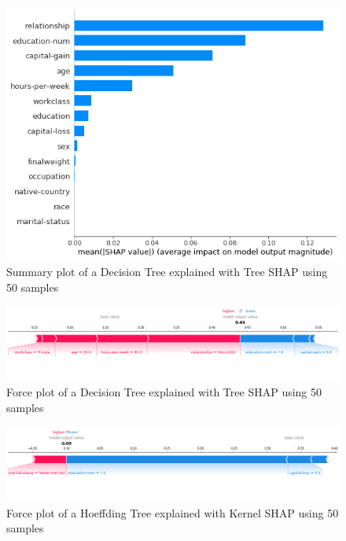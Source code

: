 \documentclass[conference]{IEEEtran}
\begin{document}
\begin{figure}[htbp]
\centerline{
	\includegraphics[width=\linewidth]{../fig/ex_01_TreeShap_DecisionTree_50_Samples_SummaryPlot.png}
}
\caption{Summary plot of a Decision Tree explained with Tree SHAP using 50 samples}
\label{fig2}
\end{figure}

\begin{figure}[htbp]
\centerline{
	\includegraphics[width=\linewidth]{../fig/ex_01_TreeShap_DecisionTree_50_Samples_ForcePlot_sample_1.png}
}
\caption{Force plot of a Decision Tree explained with Tree SHAP using 50 samples}
\label{fig3}
\end{figure}

\begin{figure}[htbp]
\centerline{
	\includegraphics[width=\linewidth]{../fig/ex_01_KernelShap_HoeffdingTree_50_Samples_ForcePlot_sample_1.png}
}
\caption{Force plot of a Hoeffding Tree explained with Kernel SHAP using 50 samples}
\label{fig4}
\end{figure}
\end{document}

